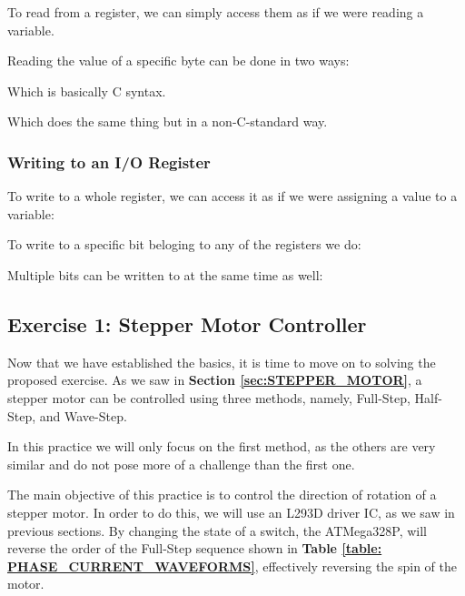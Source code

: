 To read from a register, we can simply access them as if we were reading a variable.


Reading the value of a specific byte can be done in two ways:


Which is basically C syntax.


Which does the same thing but in a non-C-standard way.

\clearpage

\subsubsection{Writing to an I/O Register}

To write to a whole register, we can access it as if we were assigning a value to a variable:


To write to a specific bit beloging to any of the registers we do:


Multiple bits can be written to at the same time as well:


\clearpage

\subsection{Exercise 1: Stepper Motor Controller}

Now that we have established the basics, it is time to move on to solving the proposed exercise. As we saw in \textbf{Section \ref{sec:STEPPER_MOTOR}}, a stepper motor can be controlled using three methods, namely, Full-Step, Half-Step, and Wave-Step.\medskip 

In this practice we will only focus on the first method, as the others are very similar and do not pose more of a challenge than the first one.\medskip

The main objective of this practice is to control the direction of rotation of a stepper motor. In order to do this, we will use an L293D driver IC, as we saw in previous sections. By changing the state of a switch, the ATMega328P, will reverse the order of the Full-Step sequence shown in \textbf{Table \ref{table: PHASE_CURRENT_WAVEFORMS}}, effectively reversing the spin of the motor.\medskip

